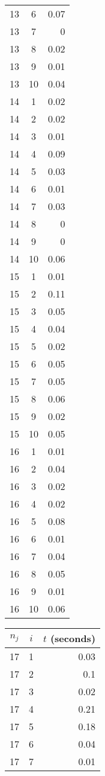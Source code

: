 \documentclass[13pt, letterpaper, oneside]{book}
\begin{document}
\begin{multicols}{4}
\begin{tabular}{c c r}
\midrule 
13 & 6 & 0.07 \\
13 & 7 & 0 \\
13 & 8 & 0.02 \\
13 & 9 & 0.01 \\
13 & 10 & 0.04 \\
14 & 1 & 0.02 \\
14 & 2 & 0.02 \\
14 & 3 & 0.01 \\
14 & 4 & 0.09 \\
14 & 5 & 0.03 \\
14 & 6 & 0.01 \\
14 & 7 & 0.03 \\
14 & 8 & 0 \\
14 & 9 & 0 \\
14 & 10 & 0.06 \\
15 & 1 & 0.01 \\
15 & 2 & 0.11 \\
15 & 3 & 0.05 \\
15 & 4 & 0.04 \\
15 & 5 & 0.02 \\
15 & 6 & 0.05 \\
15 & 7 & 0.05 \\
15 & 8 & 0.06 \\
15 & 9 & 0.02 \\
15 & 10 & 0.05 \\
16 & 1 & 0.01 \\
16 & 2 & 0.04 \\
16 & 3 & 0.02 \\
16 & 4 & 0.02 \\
16 & 5 & 0.08 \\
16 & 6 & 0.01 \\
16 & 7 & 0.04 \\
16 & 8 & 0.05 \\
16 & 9 & 0.01 \\
16 & 10 & 0.06 \\
\bottomrule
\end{tabular}
\vfill
\columnbreak
\begin{tabular}{c c r}
\toprule
$n_j$ & $i$ & $t$ (seconds) \\
\midrule 
17 & 1 & 0.03 \\
17 & 2 & 0.1 \\
17 & 3 & 0.02 \\
17 & 4 & 0.21 \\
17 & 5 & 0.18 \\
17 & 6 & 0.04 \\
17 & 7 & 0.01 \\

\end{tabular}
\end{multicols}
\end{document}
